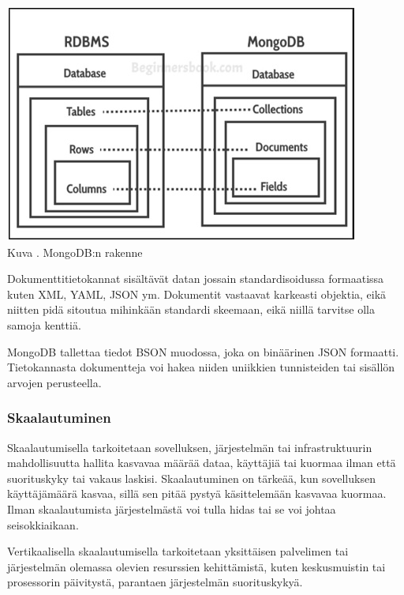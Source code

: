 \bigskip
\includegraphics{src/public/oppar/mongodb-structure.jpg} \\
Kuva \getImgCount. MongoDB:n rakenne
\medskip


Dokumenttitietokannat sisältävät datan jossain standardisoidussa formaatissa kuten XML, YAML, JSON ym.
Dokumentit vastaavat karkeasti objektia, eikä niitten pidä sitoutua mihinkään standardi skeemaan, 
eikä niillä tarvitse olla samoja kenttiä.
\medskip


MongoDB tallettaa tiedot BSON muodossa, joka on binäärinen JSON formaatti.
Tietokannasta dokumentteja voi hakea niiden uniikkien tunnisteiden tai sisällön arvojen perusteella.
\medskip






\subsubsection{Skaalautuminen}




Skaalautumisella tarkoitetaan sovelluksen, järjestelmän tai infrastruktuurin
mahdollisuutta hallita kasvavaa määrää dataa, käyttäjiä tai kuormaa ilman että suorituskyky tai vakaus laskisi.
Skaalautuminen on tärkeää, kun sovelluksen käyttäjämäärä kasvaa, sillä sen pitää pystyä käsittelemään kasvavaa kuormaa.
Ilman skaalautumista järjestelmästä voi tulla hidas tai se voi johtaa seisokkiaikaan.
\medskip

Vertikaalisella skaalautumisella tarkoitetaan yksittäisen palvelimen tai järjestelmän olemassa olevien resurssien kehittämistä, 
kuten keskusmuistin tai prosessorin päivitystä, parantaen järjestelmän suorituskykyä.
\medskip

